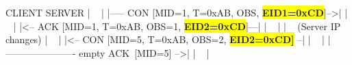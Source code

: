 \begin{myverbbox}{\server}
   CLIENT                                       SERVER
    | \colorbox{white}{\ }                                          |
    |----- CON [MID=1, T=0xAB, OBS, \colorbox{yellow}{\textbf{EID1=0xCD}}]-->|
    | \colorbox{white}{\ }                                          |
    |<-- ACK [MID=1, T=0xAB, OBS=1, \colorbox{yellow}{\textbf{EID2=0xCD}}]---|
    | \colorbox{white}{\ }                                          |
    | \colorbox{white}{\ }                                (Server IP changes)
    | \colorbox{white}{\ }                                          |
    |<-- CON [MID=5, T=0xAB, OBS=2, \colorbox{yellow}{\textbf{EID2=0xCD]}} --|
    | \colorbox{white}{\ }                                          |
    |---------------------- empty ACK\colorbox{white}{\ }[MID=5] -->|
    | \colorbox{white}{\ }                                          |
\end{myverbbox}
